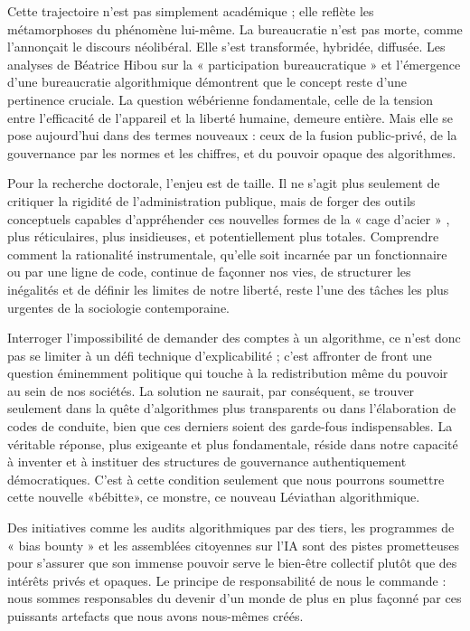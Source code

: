 Cette trajectoire n'est pas simplement académique ; elle reflète les métamorphoses du phénomène lui-même. La bureaucratie n'est pas morte, comme l'annonçait le discours néolibéral. Elle s'est transformée, hybridée, diffusée. Les analyses de Béatrice Hibou sur la « participation bureaucratique »  et l'émergence d'une bureaucratie algorithmique démontrent que le concept reste d'une pertinence cruciale. La question wébérienne fondamentale, celle de la tension entre l'efficacité de l'appareil et la liberté humaine, demeure entière. Mais elle se pose aujourd'hui dans des termes nouveaux : ceux de la fusion public-privé, de la gouvernance par les normes et les chiffres, et du pouvoir opaque des algorithmes.

Pour la recherche doctorale, l'enjeu est de taille. Il ne s'agit plus seulement de critiquer la rigidité de l'administration publique, mais de forger des outils conceptuels capables d'appréhender ces nouvelles formes de la « cage d'acier » , plus réticulaires, plus insidieuses, et potentiellement plus totales. Comprendre comment la rationalité instrumentale, qu'elle soit incarnée par un fonctionnaire ou par une ligne de code, continue de façonner nos vies, de structurer les inégalités et de définir les limites de notre liberté, reste l'une des tâches les plus urgentes de la sociologie contemporaine. 

Interroger l'impossibilité de demander des comptes à un algorithme, ce n'est donc pas se limiter à un défi technique d'explicabilité ; c'est affronter de front une question éminemment politique qui touche à la redistribution même du pouvoir au sein de nos sociétés. La solution ne saurait, par conséquent, se trouver seulement dans la quête d'algorithmes plus transparents ou dans l'élaboration de codes de conduite, bien que ces derniers soient des garde-fous indispensables. La véritable réponse, plus exigeante et plus fondamentale, réside dans notre capacité à inventer et à instituer des structures de gouvernance authentiquement démocratiques. C'est à cette condition seulement que nous pourrons soumettre cette {\large nouvelle} {\large «bébitte»}, ce {\LARGE monstre}, ce {\LARGE nouveau} {\huge Léviathan algorithmique}.

Des initiatives comme les audits algorithmiques par des tiers, les programmes de « bias bounty » \citet{AlgorithmWatch2021} et les assemblées citoyennes sur l'IA sont des pistes prometteuses pour s'assurer que son immense pouvoir serve le bien-être collectif plutôt que des intérêts privés et opaques. Le principe de responsabilité de \citet{Jonas2021Das} nous le commande : nous sommes responsables du devenir d'un monde de plus en plus façonné par ces puissants artefacts que nous avons nous-mêmes créés.

